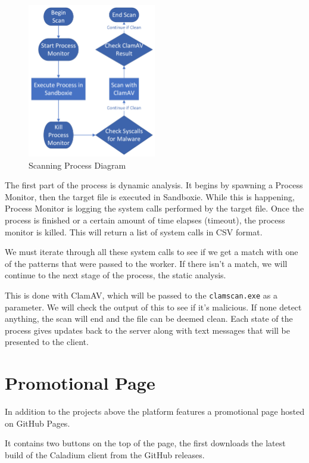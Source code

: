 \begin{figure}[h!]
    \centering
    \includegraphics[width=0.5\textwidth]{images/diagrams/scan_process}
    \caption{Scanning Process Diagram}
    \label{image:scanningProcess}
\end{figure}

The first part of the process is dynamic analysis.
It begins by spawning a Process Monitor,
then the target file is executed in Sandboxie.
While this is happening,
Process Monitor is logging the system calls performed by the target file.
Once the process is finished or a certain amount of time elapses (timeout),
the process monitor is killed. This will return a list of system calls in CSV format.

We must iterate through all these system calls to see if we
get a match with one of the patterns that were passed to the worker.
If there isn't a match, we will continue to the next stage of the process,
the static analysis.

This is done with ClamAV, which will be passed to the
\texttt{clamscan.exe} as a parameter.
We will check the output of this to see if it's malicious. If none detect anything,
the scan will end and the file can be deemed clean.
Each state of the process gives updates back to the server along with
text messages that will be presented to the client.

\section{Promotional Page}
In addition to the projects above the platform features a promotional page hosted on GitHub Pages.

It contains two buttons on the top of the page, the first downloads the latest build of the Caladium client from the GitHub releases.

